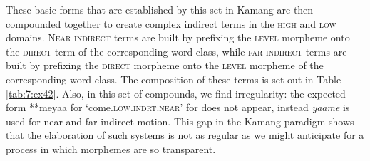 These basic forms that are established by this set in Kamang are then compounded together to create complex indirect terms in the \textsc{high} and \textsc{low} domains. N\textsc{ear} \textsc{indirect} terms are built by prefixing the \textsc{level} morpheme onto the \textsc{direct} term of the corresponding word class, while \textsc{far} \textsc{indirect} terms are built by prefixing the \textsc{direct} morpheme onto the \textsc{level} morpheme of the corresponding word class. The composition of these terms is set out in Table \ref{tab:7:ex42}. Also, in this set of compounds, we find irregularity: the expected form **meyaa{\ng} for `come.\textsc{low.indrt.near}' for does not appear, instead \textit{yaa{\ng}me} is used for near and far indirect motion. This gap in the Kamang paradigm shows that the elaboration of such systems is not as regular as we might anticipate for a process in which morphemes are so transparent. 



